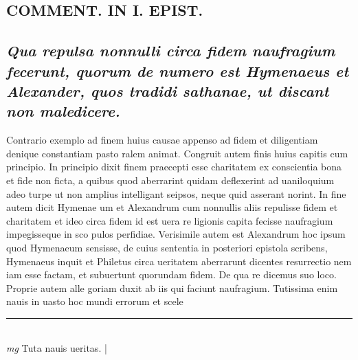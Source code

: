 \documentclass{article}
\begin{document}
\begin{pages}
\section*{COMMENT. IN I. EPIST. }
{}
\subsection*{\textit{Qua repulsa nonnulli circa fidem naufragium fecerunt, quorum de numero est Hymenaeus et Alexander, quos tradidi sathanae, ut discant non maledicere. }}\pstart Contrario exemplo ad finem huius causae appenso ad fidem et diligentiam denique constantiam pasto ralem animat. Congruit autem finis huius capitis cum principio. In principio dixit finem praecepti esse charitatem ex conscientia bona et fide non ficta, a quibus quod aberrarint quidam deflexerint ad uaniloquium adeo turpe ut non amplius intelligant seipsos, neque quid asserant norint. In fine autem dicit Hymenae um et Alexandrum cum nonnullis aliis repulisse fidem et charitatem et ideo circa fidem id est uera re ligionis capita fecisse naufragium impegisseque in sco pulos perfidiae. Verisimile autem est Alexandrum hoc ipsum quod Hymenaeum sensisse, de cuius sententia in posteriori epistola scribens, Hymenaeus inquit et Philetus circa ueritatem aberrarunt dicentes resurrectio nem iam esse factam, et subuertunt quorundam fidem. De qua re dicemus suo loco. Proprie autem alle goriam duxit ab iis qui faciunt naufragium. Tutissima enim nauis in uasto hoc mundi errorum et scele\pend
\vspace{0.5cm}\noindent
\vspace{0.2cm}\rule{1cm}{0.2pt}\\ 
\hspace{0.2cm}\textit{mg}
\footnotesize Tuta nauis ueritas. 
\normalsize| 

\end{pages}
\end{document}
